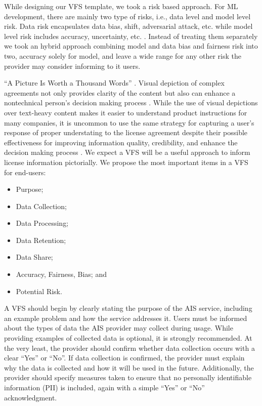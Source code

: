 \documentclass[manuscript,screen,review]{acmart}
\begin{document}
	While designing our VFS template, we took a risk based approach. For ML development, there are mainly two type of risks, i.e., data level and model level risk. Data risk encapsulates data bias, shift, adversarial attack, etc. while model level risk includes accuracy, uncertainty, etc. \cite{ZHANG2022113800}. Instead of treating them separately we took an hybrid approach combining model and data bias and fairness risk into two, accuracy solely for model, and leave a wide range for any other risk the provider may consider informing to it users.

	\enquote{A Picture Is Worth a Thousand Words} \cite{sullivan_picture_2017}. Visual depiction of complex agreements not only provides clarity of the content but also can enhance a nontechnical person's decision making process \cite{suters_emergence_2023} \cite{kim_impact_2021}. While the use of visual depictions over text-heavy content makes it easier to understand product instructions for many companies, it is uncommon to use the same strategy for capturing a user's response of proper understating to the license agreement despite their possible effectiveness for improving information quality, credibility, and enhance the decision making process \cite{kim_impact_2021}. We expect a VFS will be a useful approach to inform license information pictorially. We propose the most important items in a VFS for end-users:
	\begin{itemize}
		\item Purpose;
		\item Data Collection;
		\item Data Processing;
		\item Data Retention;
		\item Data Share;
		\item Accuracy, Fairness, Bias; and 
		\item Potential Risk.
	\end{itemize}

	A VFS should begin by clearly stating the purpose of the AIS service, including an example problem and how the service addresses it. Users must be informed about the types of data the AIS provider may collect during usage. While providing examples of collected data is optional, it is strongly recommended. At the very least, the provider should confirm whether data collection occurs with a clear \enquote{Yes} or \enquote{No}. If data collection is confirmed, the provider must explain why the data is collected and how it will be used in the future. Additionally, the provider should specify measures taken to ensure that no personally identifiable information (PII) is included, again with a simple \enquote{Yes} or \enquote{No} acknowledgment.
	
\end{document}
